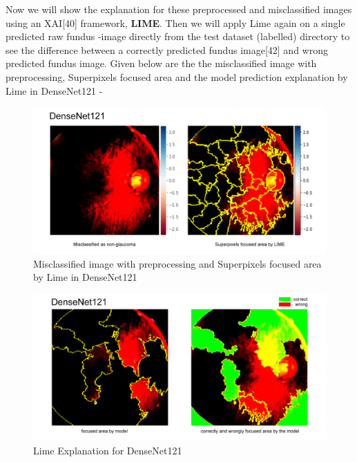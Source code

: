 \vspace{5mm}
Now we will show the explanation for these preprocessed and misclassified images using an XAI[40] framework, \textbf{LIME}. Then we will apply Lime again on a single predicted raw fundus -image directly from the test dataset (labelled) directory to see the difference between a correctly predicted fundus image[42] and wrong predicted fundus image.
Given below are the the misclassified image with preprocessing, Superpixels focused area and the model prediction explanation by Lime in DenseNet121 -

\vspace{5mm}
\begin{figure}[hbt!]
\centering
\includegraphics[scale=0.5]{images/fig-42.png}
\caption{Misclassified image with preprocessing and Superpixels focused area by Lime in DenseNet121}
\label{fig:x Misclassified image with preprocessing and Superpixels focused area by Lime in DenseNet121}
\end{figure}

\vspace{5mm}
\begin{figure}[hbt!]
\centering
\includegraphics[scale=0.5]{images/fig-43.png}
\caption{Lime Explanation for DenseNet121}
\label{fig:x Lime Explanation for DenseNet121}
\end{figure}

